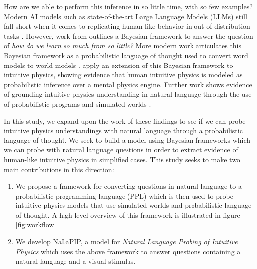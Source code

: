 \documentclass[10pt,letterpaper]{article}
\begin{document}
How are we able to perform this inference in so little time, with so few examples? Modern AI models such as state-of-the-art Large Language Models (LLMs) still fall short when it comes to replicating human-like behavior in out-of-distribution tasks \cite{Collins2022StructuredFA}. However, work from  outlines a Bayesian framework to answer the question of \textit{how do we learn so much from so little?} More modern work articulates this Bayesian framework as a probabilistic language of thought used to convert word models to world models \cite{2306.12672}.   apply an extension of this Bayesian framework to intuitive physics, showing evidence that human intuitive physics is modeled as probabilistic inference over a mental physics engine. Further work shows evidence of grounding intuitive physics understanding in natural language through the use of probabilistic programs and simulated worlds \cite{zhang2023grounded}. 

In this study, we expand upon the work of these findings to see if we can probe intuitive physics understandings with natural language through a probabilistic language of thought. We seek to build a model using Bayesian frameworks which we can probe with natural language questions in order to extract evidence of human-like intuitive physics in simplified cases. This study seeks to make two main contributions in this direction:
\begin{enumerate}
    \item We propose a framework for converting questions in natural language to a probabilistic programming language (PPL) which is then used to probe intuitive physics models that use simulated worlds and probabilistic language of thought. A high level overview of this framework is illustrated in figure \ref{fig:workflow}
    \item We develop NaLaPIP, a model for \textit{Natural Language Probing of Intuitive Physics} which uses the above framework to answer questions containing a natural language and a visual stimulus. 
\end{enumerate}
\end{document}

